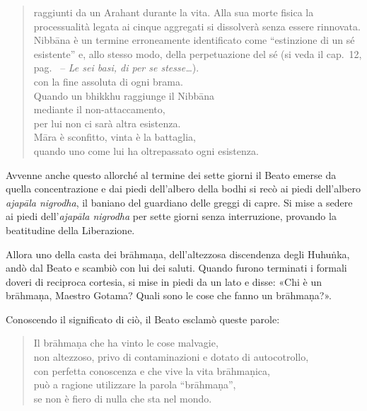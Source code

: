 \begin{quote}
{    raggiunti da un Arahant durante la vita. Alla sua morte fisica la
    processualità legata ai cinque aggregati si dissolverà senza essere
    rinnovata. Nibbāna è un termine erroneamente identificato come “estinzione
    di un sé esistente” e, allo stesso
    modo, della perpetuazione del sé (si veda il cap.~12, pag.~\pageref{pag254} -- \emph{Le sei basi, di per se stesse\ldots}).} \\
  con la fine assoluta di ogni brama. \\
  Quando un bhikkhu raggiunge il Nibbāna \\
  mediante il non-attaccamento, \\
  per lui non ci sarà altra esistenza. \\
  Māra è sconfitto, vinta è la battaglia, \\
  quando uno come lui ha oltrepassato ogni esistenza.

\end{quote}


 Avvenne anche questo allorché al termine dei sette giorni
il Beato emerse da quella concentrazione e dai piedi dell’albero della bodhi si
recò ai piedi dell’albero \emph{ajapāla nigrodha}, il baniano del guardiano
delle greggi di capre. Si mise a sedere ai piedi dell’\emph{ajapāla nigrodha}
per sette giorni senza interruzione, provando la beatitudine della Liberazione.

Allora uno della casta dei brāhmaṇa, dell’altezzosa discendenza degli Huhuṅka,
andò dal Beato e scambiò con lui dei saluti. Quando furono terminati i formali
doveri di reciproca cortesia, si mise in piedi da un lato e disse: «Chi è un
brāhmaṇa, Maestro Gotama? Quali sono le cose che fanno un brāhmaṇa?».

Conoscendo il significato di ciò, il Beato esclamò queste parole:

\begin{quote}
Il brāhmaṇa che ha vinto le cose malvagie, \\
non altezzoso, privo di contaminazioni e dotato di autocotrollo, \\
con perfetta conoscenza e che vive la vita brāhmaṇica, \\
può a ragione utilizzare la parola “brāhmaṇa”, \\
se non è fiero di nulla che sta nel mondo.
\end{quote}


